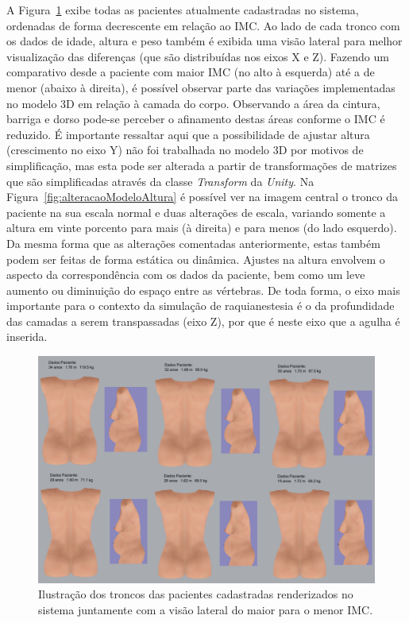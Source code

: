 A Figura~\ref{fig:pacientesMaiorParaMenorIMCVisaoTroncoELateral} exibe todas as pacientes atualmente cadastradas no sistema, ordenadas de forma decrescente em relação ao \acrshort{IMC}. Ao lado de cada tronco com os dados de idade, altura e peso também é exibida uma visão lateral para melhor visualização das diferenças (que são distribuídas nos eixos X e Z). Fazendo um comparativo desde a paciente com maior \acrshort{IMC} (no alto à esquerda) até a de menor (abaixo à direita), é possível observar parte das variações implementadas no modelo 3D em relação à camada do corpo. Observando a área da cintura, barriga e dorso pode-se perceber o afinamento destas áreas conforme o \acrshort{IMC} é reduzido. É importante ressaltar aqui que a possibilidade de ajustar altura (crescimento no eixo Y) não foi trabalhada no modelo 3D por motivos de simplificação, mas esta pode ser alterada a partir de transformações de matrizes que são simplificadas através da classe \textit{Transform} da \textit{Unity}. Na Figura~\ref{fig:alteracaoModeloAltura} é possível ver na imagem central o tronco da paciente na sua escala normal e duas alterações de escala, variando somente a altura em vinte porcento para mais (à direita) e para menos (do lado esquerdo). Da mesma forma que as alterações comentadas anteriormente, estas também podem ser feitas de forma estática ou dinâmica. Ajustes na altura envolvem o aspecto da correspondência com os dados da paciente, bem como um leve aumento ou diminuição do espaço entre as vértebras. De toda forma, o eixo mais importante para o contexto da simulação de raquianestesia é o da profundidade das camadas a serem transpassadas (eixo Z), por que é neste eixo que a agulha é inserida.

\begin{figure}[ht!]
    \centering
    \includegraphics[width=0.9\linewidth]{capitulos/figuras/pacientes cadastradas maior para menor imc visao tronco sentado e lateral.png} 
    \caption{Ilustração dos troncos das pacientes cadastradas renderizados no sistema juntamente com a visão lateral do maior para o menor IMC.}
    \label{fig:pacientesMaiorParaMenorIMCVisaoTroncoELateral}
\end{figure}

